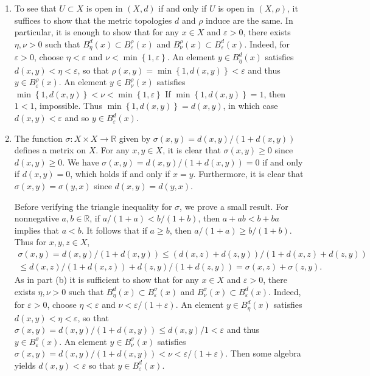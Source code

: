\documentclass[11pt,leqno]{article}
\theoremstyle{plain}
\theoremstyle{definition}
\numberwithin{equation}{section}
\numberwithin{lem}{section}
\newcommand{\cbr}[1]{\left\{#1\right\}}
\begin{document}
\begin{enumerate}
\begin{enumerate}
    \item To see that $U\subset X$ is open in $(X,d)$ if and only if $U$ is open in $(X,\rho)$, it suffices to show that the metric topologies $d$ and $\rho$ induce are the same. In particular, it is enough to show that for any $x\in X$ and $\varepsilon>0$, there exists $\eta, \nu>0$ such that $B_\eta^d(x)\subset B_\varepsilon^\rho(x)$ and $B_\nu^\rho(x)\subset B_\varepsilon^d(x)$. Indeed, for $\varepsilon>0$, choose $\eta < \varepsilon$ and $\nu< \min\cbr{1,\varepsilon}$. An element $y\in B_\eta^d(x)$ satisfies $d(x,y)<\eta<\varepsilon$, so that $\rho(x,y) = \min\cbr{1,d(x,y)} < \varepsilon$ and thus $y\in B_\varepsilon^\rho(x)$. An element $y\in B_\nu^\rho(x)$ satisfies $\min\cbr{1,d(x,y)}<\nu<\min\cbr{1,\varepsilon}$ If $\min\cbr{1,d(x,y)} = 1$, then $1<1$, impossible. Thus $\min\cbr{1,d(x,y)} = d(x,y)$, in which case $d(x,y)<\varepsilon$ and so $y\in B_\varepsilon^d(x)$.
    
    \item The function $\sigma\colon X\times X\to \mathbb R$ given by $\sigma(x,y) = d(x,y)/(1+d(x,y))$ defines a metrix on $X$. For any $x,y\in X$, it is clear that $\sigma(x,y) \geq 0$ since $d(x,y)\geq 0$. We have $\sigma(x,y) = d(x,y)/(1+d(x,y)) = 0$ if and only if $d(x,y) = 0$, which holds if and only if $x=y$. Furthermore, it is clear that $\sigma(x,y) = \sigma(y,x)$ since $d(x,y) = d(y,x)$.
    
    Before verifying the triangle inequality for $\sigma$, we prove a small result. For nonnegative $a,b\in \mathbb R$, if $a/(1+a)< b/(1+b)$, then $a+ ab < b + ba$ implies that $a<b$. It follows that if $a\geq b$, then $a/(1+a)\geq b/(1+b)$. Thus for $x,y,z\in X$, \begin{multline*}
      \sigma(x,y) = d(x,y)/(1+d(x,y)) \leq (d(x,z) + d(z,y))/(1+ d(x,z) + d(z,y))\\ \leq d(x,z)/(1+ d(x,z)) + d(z,y)/(1+d(z,y)) = \sigma(x,z) + \sigma(z,y).
    \end{multline*}
    As in part (b) it is sufficient to show that for any $x\in X$ and $\varepsilon>0$, there exists $\eta, \nu>0$ such that $B_\eta^d(x)\subset B_\varepsilon^\sigma(x)$ and $B_\nu^\sigma(x)\subset B_\varepsilon^d(x)$. Indeed, for $\varepsilon>0$, choose $\eta< \varepsilon$ and $\nu <\varepsilon/(1+\varepsilon)$. An element $y\in B_\eta^d(x)$ satisfies $d(x,y)<\eta<\varepsilon$, so that $\sigma(x,y) = d(x,y)/(1+d(x,y))\leq d(x,y)/1 < \varepsilon$ and thus $y\in B_\varepsilon^\sigma(x)$. An element $y\in B_\nu^\sigma(x)$ satisfies $\sigma(x,y) = d(x,y)/(1+d(x,y))<\nu< \varepsilon/(1+\varepsilon)$. Then some algebra yields $d(x,y)<\varepsilon$ so that $y\in B_\varepsilon^d(x)$.
  \end{enumerate}
  

\end{enumerate}
\end{document}
